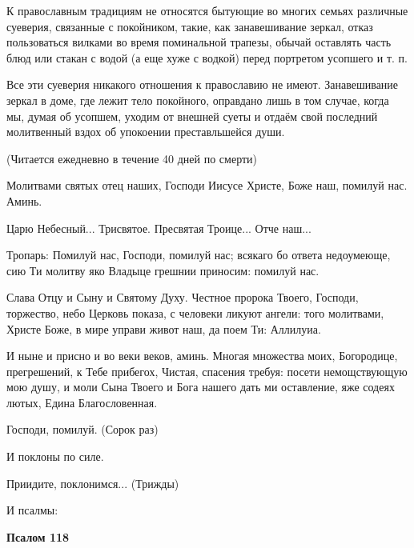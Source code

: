 К православным традициям не относятся бытующие во многих семьях различные суеверия, связанные с покойником, такие, как занавешивание зеркал, отказ пользоваться вилками во время поминальной трапезы, обычай оставлять часть блюд или стакан с водой (а еще хуже с водкой) перед портретом усопшего и т. п. 

Все эти суеверия никакого отношения к православию не имеют. Занавешивание зеркал в доме, где лежит тело покойного, оправдано лишь в том случае, когда мы, думая об усопшем, уходим от внешней суеты и отдаём свой последний молитвенный вздох об упокоении преставльшейся души.\bfseries \itshape  

\normalfont{}\normalfont{} 


\mychapterending

 


(Читается ежедневно в течение 40 дней по смерти) 

Молитвами святых отец наших, Господи Иисусе Христе, Боже наш, помилуй нас. Аминь. 

Царю Небесный... Трисвятое. Пресвятая Троице... Отче наш... 

Тропарь: Помилуй нас, Господи, помилуй нас; всякаго бо ответа недоумеюще, сию Ти молитву яко Владыце грешнии приносим: помилуй нас. 

Слава Отцу и Сыну и Святому Духу. Честное пророка Твоего, Господи, торжество, небо Церковь показа, с человеки ликуют ангели: того молитвами, Христе Боже, в мире управи живот наш, да поем Ти: Аллилуиа. 

И ныне и присно и во веки веков, аминь. Многая множества моих, Богородице, прегрешений, к Тебе прибегох, Чистая, спасения требуя: посети немощствующую мою душу, и моли Сына Твоего и Бога нашего дать ми оставление, яже содеях лютых, Едина Благословенная. 

Господи, помилуй. (Сорок раз) 

И поклоны по силе. 

Приидите, поклонимся... (Трижды) 

И псалмы:


\medskip


\bfseries Псалом 118\normalfont{}


